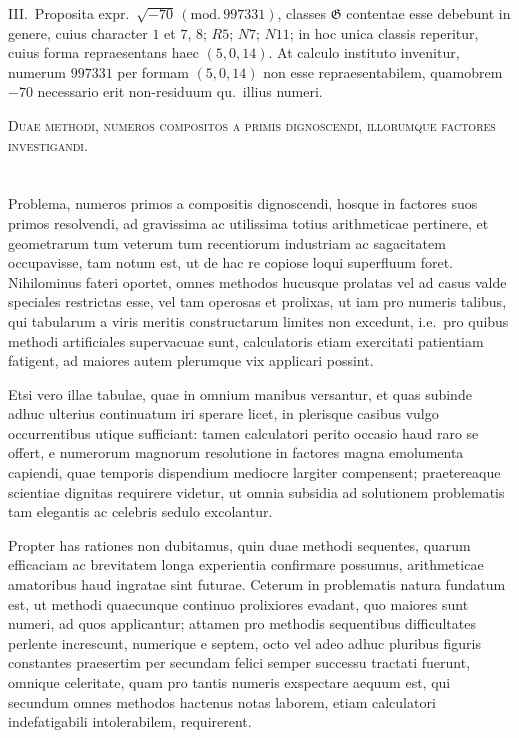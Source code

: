 \documentclass[12pt,a4paper]{article}
\theoremstyle{plain}
\theoremstyle{definition}
\theoremstyle{remark}
\begin{document}
\textsc{III.}\ Proposita expr.~$\surd{-70}\,(\mathrm{mod.}\,997331)$, classes $\mathfrak{G}$ contentae esse debebunt in genere, cuius character $1$ et $7$, $8$; $R5$; $N7$; $N11$; in hoc unica classis reperitur, cuius forma repraesentans haec $(5,0,14)$. At calculo instituto invenitur, numerum $997331$ per formam $(5,0,14)$ non esse repraesentabilem, quamobrem $-70$ necessario erit non-residuum qu.\ illius numeri.

\bigskip
\noindent\textsc{Duae methodi, numeros compositos a primis dignoscendi, illorumque factores investigandi.}

\section{}

Problema, numeros primos a compositis dignoscendi, hosque in factores suos primos resolvendi, ad gravissima ac utilissima totius arithmeticae pertinere, et geometrarum tum veterum tum recentiorum industriam ac sagacitatem occupavisse, tam notum est, ut de hac re copiose loqui superfluum foret. Nihilominus fateri oportet, omnes methodos hucusque prolatas vel ad casus valde speciales restrictas esse, vel tam operosas et prolixas, ut iam pro numeris talibus, qui tabularum a viris meritis constructarum limites non excedunt, i.e.\ pro quibus methodi artificiales supervacuae sunt, calculatoris etiam exercitati patientiam fatigent, ad maiores autem plerumque vix applicari possint.

Etsi vero illae tabulae, quae in omnium manibus versantur, et quas subinde adhuc ulterius continuatum iri sperare licet, in plerisque casibus vulgo occurrentibus utique sufficiant: tamen calculatori perito occasio haud raro se offert, e numerorum magnorum resolutione in factores magna emolumenta capiendi, quae temporis dispendium mediocre largiter compensent; praetereaque scientiae dignitas requirere videtur, ut omnia subsidia ad solutionem problematis tam elegantis ac celebris sedulo excolantur.

Propter has rationes non dubitamus, quin duae methodi sequentes, quarum efficaciam ac brevitatem longa experientia confirmare possumus, arithmeticae amatoribus haud ingratae sint futurae. Ceterum in problematis natura fundatum est, ut methodi quaecunque continuo prolixiores evadant, quo maiores sunt numeri, ad quos applicantur; attamen pro methodis sequentibus difficultates perlente increscunt, numerique e septem, octo vel adeo adhuc pluribus figuris constantes praesertim per secundam felici semper successu tractati fuerunt, omnique celeritate, quam pro tantis numeris exspectare aequum est, qui secundum omnes methodos hactenus notas laborem, etiam calculatori indefatigabili intolerabilem, requirerent.
\end{document}
